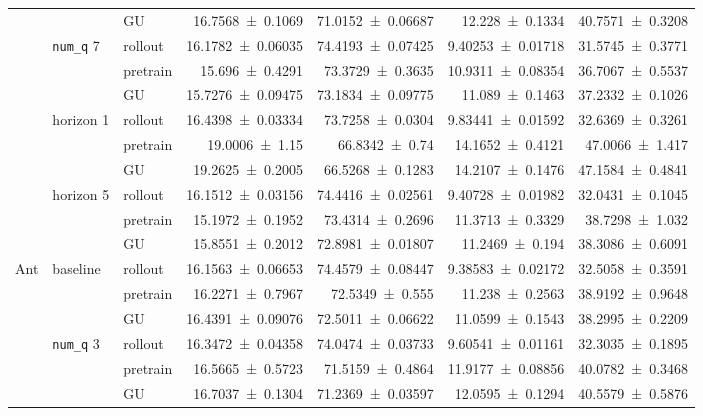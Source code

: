 {\begin{longtable}{@{}lllrrrr@{}}
     &  & GU & \num{16.7568+-0.1069} & \num{71.0152+-0.06687} & \num{12.228+-0.1334} & \num{40.7571+-0.3208} \\
    \addlinespace[2pt]
     & \texttt{num\_q} 7 & rollout & \num{16.1782+-0.06035} & \num{74.4193+-0.07425} & \num{9.40253+-0.01718} & \num{31.5745+-0.3771} \\
     &  & pretrain & \num{15.696+-0.4291} & \num{73.3729+-0.3635} & \num{10.9311+-0.08354} & \num{36.7067+-0.5537} \\
     &  & GU & \num{15.7276+-0.09475} & \num{73.1834+-0.09775} & \num{11.089+-0.1463} & \num{37.2332+-0.1026} \\
    \addlinespace[2pt]
     & horizon 1 & rollout & \num{16.4398+-0.03334} & \num{73.7258+-0.0304} & \num{9.83441+-0.01592} & \num{32.6369+-0.3261} \\
     &  & pretrain & \num{19.0006+-1.15} & \num{66.8342+-0.74} & \num{14.1652+-0.4121} & \num{47.0066+-1.417} \\
     &  & GU & \num{19.2625+-0.2005} & \num{66.5268+-0.1283} & \num{14.2107+-0.1476} & \num{47.1584+-0.4841} \\
    \addlinespace[2pt]
     & horizon 5 & rollout & \num{16.1512+-0.03156} & \num{74.4416+-0.02561} & \num{9.40728+-0.01982} & \num{32.0431+-0.1045} \\
     &  & pretrain & \num{15.1972+-0.1952} & \num{73.4314+-0.2696} & \num{11.3713+-0.3329} & \num{38.7298+-1.032} \\
     &  & GU & \num{15.8551+-0.2012} & \num{72.8981+-0.01807} & \num{11.2469+-0.194} & \num{38.3086+-0.6091} \\
    \addlinespace[2pt]
    \midrule
    Ant & baseline & rollout & \num{16.1563+-0.06653} & \num{74.4579+-0.08447} & \num{9.38583+-0.02172} & \num{32.5058+-0.3591} \\
     &  & pretrain & \num{16.2271+-0.7967} & \num{72.5349+-0.555} & \num{11.238+-0.2563} & \num{38.9192+-0.9648} \\
     &  & GU & \num{16.4391+-0.09076} & \num{72.5011+-0.06622} & \num{11.0599+-0.1543} & \num{38.2995+-0.2209} \\
    \addlinespace[2pt]
     & \texttt{num\_q} 3 & rollout & \num{16.3472+-0.04358} & \num{74.0474+-0.03733} & \num{9.60541+-0.01161} & \num{32.3035+-0.1895} \\
     &  & pretrain & \num{16.5665+-0.5723} & \num{71.5159+-0.4864} & \num{11.9177+-0.08856} & \num{40.0782+-0.3468} \\
     &  & GU & \num{16.7037+-0.1304} & \num{71.2369+-0.03597} & \num{12.0595+-0.1294} & \num{40.5579+-0.5876} \\

\end{longtable}}

